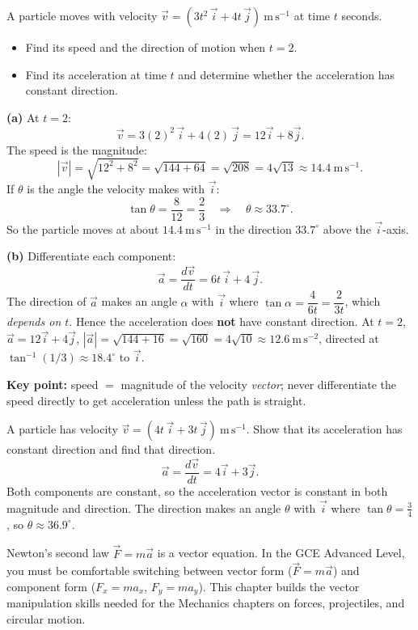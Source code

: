 \documentclass[11pt]{article}
\begin{document}
\begin{exoresolu}
A particle moves with velocity $\vec{v} = (3t^2\,\vec{i} + 4t\,\vec{j})\ \mathrm{m\,s^{-1}}$ at time $t$ seconds.
\begin{itemize}
\item[(a)] Find its speed and the direction of motion when $t = 2$.
\item[(b)] Find its acceleration at time $t$ and determine whether the acceleration has constant direction.
\end{itemize}
\tcblower
\textbf{(a)} At $t = 2$:
\[ \vec{v} = 3(2)^2\,\vec{i} + 4(2)\,\vec{j} = 12\vec{i} + 8\vec{j}. \]
The speed is the magnitude:
\[ |\vec{v}| = \sqrt{12^2 + 8^2} = \sqrt{144 + 64} = \sqrt{208} = 4\sqrt{13} \approx 14.4\ \mathrm{m\,s^{-1}}. \]
If $\theta$ is the angle the velocity makes with $\vec{i}$:
\[ \tan\theta = \frac{8}{12} = \frac{2}{3} \quad\Longrightarrow\quad \theta \approx 33.7^\circ. \]
So the particle moves at about $14.4\ \mathrm{m\,s^{-1}}$ in the direction $33.7^\circ$ above the $\vec{i}$-axis.

\textbf{(b)} Differentiate each component:
\[ \vec{a} = \frac{d\vec{v}}{dt} = 6t\,\vec{i} + 4\,\vec{j}. \]
The direction of $\vec{a}$ makes an angle $\alpha$ with $\vec{i}$ where $\tan\alpha = \dfrac{4}{6t} = \dfrac{2}{3t}$, which \emph{depends on $t$}. Hence the acceleration does \textbf{not} have constant direction. At $t=2$, $\vec{a} = 12\vec{i} + 4\vec{j}$, $|\vec{a}| = \sqrt{144+16} = \sqrt{160} = 4\sqrt{10} \approx 12.6\ \mathrm{m\,s^{-2}}$, directed at $\tan^{-1}(1/3) \approx 18.4^\circ$ to $\vec{i}$.

\textbf{Key point:} speed $=$ magnitude of the velocity \emph{vector}; never differentiate the speed directly to get acceleration unless the path is straight.
\end{exoresolu}

\begin{exoresolu}
A particle has velocity $\vec{v} = (4t\,\vec{i} + 3t\,\vec{j})\ \mathrm{m\,s^{-1}}$. Show that its acceleration has constant direction and find that direction.
\tcblower
\[ \vec{a} = \frac{d\vec{v}}{dt} = 4\vec{i} + 3\vec{j}. \]
Both components are constant, so the acceleration vector is constant in both magnitude and direction. The direction makes an angle $\theta$ with $\vec{i}$ where $\tan\theta = \frac{3}{4}$, so $\theta \approx 36.9^\circ$.
\end{exoresolu}

\begin{savaistu}
Newton's second law $\vec{F} = m\vec{a}$ is a vector equation. In the GCE Advanced Level, you must be comfortable switching between vector form ($\vec{F} = m\vec{a}$) and component form ($F_x = m a_x$, $F_y = m a_y$). This chapter builds the vector manipulation skills needed for the Mechanics chapters on forces, projectiles, and circular motion.
\end{savaistu}
\end{document}

